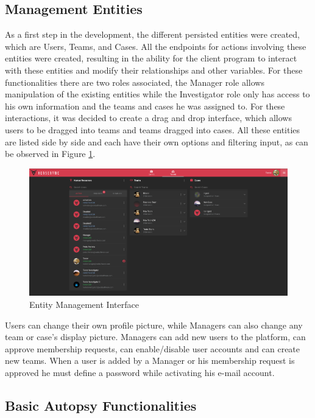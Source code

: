 \subsection{Management Entities}

As a first step in the development, the different persisted entities were created, which are Users, Teams, and Cases. All the endpoints for actions involving these 
entities were created, resulting in the ability for the client program to interact with these entities and modify their relationships and other variables.
For these functionalities there are two roles associated, the Manager role allows manipulation of the existing entities while the Investigator role only has access to his
own information and the teams and cases he was assigned to. For these interactions, it was decided to create a drag and drop interface, which allows users to be dragged into
teams and teams dragged into cases. All these entities are listed side by side and each have their own options and filtering input, as can be observed in Figure \ref{fig:users}.

\begin{figure}[h]
 \centering
 \includegraphics[width=1\linewidth]{imgs/users.png}
 \caption{Entity Management Interface}
 \label{fig:users}
\end{figure}

Users can change their own profile picture, while Managers can also change any team or case's display picture.
Managers can add new users to the platform, can approve membership requests, can enable/disable user accounts and can create new teams.
When a user is added by a Manager or his membership request is approved he must define a password while activating his e-mail account.

\subsection{Basic Autopsy Functionalities}


